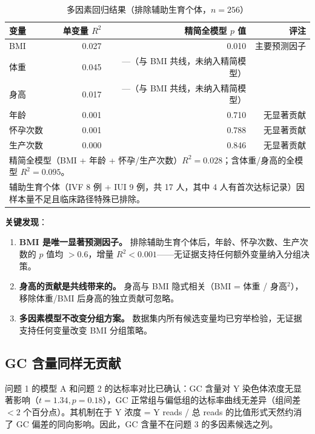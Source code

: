 \documentclass{mcm-paper}
\begin{document}
\begin{table}[H]
\centering
\caption{多因素回归结果（排除辅助生育个体，$n=256$）}
\label{tab:multi}
\begin{tabular}{lrrr}
\toprule
变量 & 单变量 $R^2$ & 精简全模型 $p$ 值 & 评注 \\
\midrule
BMI     & 0.027 & 0.010 & 主要预测因子 \\
体重     & 0.045 & —（与 BMI 共线，未纳入精简模型） & \\
身高     & 0.017 & —（与 BMI 共线，未纳入精简模型） & \\
年龄     & 0.001 & 0.710 & 无显著贡献 \\
怀孕次数   & 0.001 & 0.788 & 无显著贡献 \\
生产次数   & 0.000 & 0.846 & 无显著贡献 \\
\bottomrule
\multicolumn{4}{l}{\footnotesize 精简全模型（BMI + 年龄 + 怀孕/生产次数）$R^2=0.028$；含体重/身高的全模型 $R^2=0.095$。} \\
\multicolumn{4}{l}{\footnotesize 辅助生育个体（IVF 8 例 + IUI 9 例，共 17 人，其中 4 人有首次达标记录）因样本量不足且临床路径特殊已排除。} \\
\end{tabular}
\end{table}

\textbf{关键发现}：

\begin{enumerate}
    \item \textbf{BMI 是唯一显著预测因子。} 排除辅助生育个体后，年龄、怀孕次数、生产次数的 $p$ 值均 $>0.6$，增量 $R^2 < 0.001$——无证据支持任何额外变量纳入分组决策。
    \item \textbf{身高的贡献是共线带来的。} 身高与 BMI 隐式相关（BMI = 体重 / 身高$^2$），移除体重/BMI 后身高的独立贡献可忽略。
    \item \textbf{多因素模型不改变分组方案。} 数据集内所有候选变量均已穷举检验，无证据支持任何变量改变 BMI 分组策略。
\end{enumerate}

\subsection{GC 含量同样无贡献}

问题 1 的模型 A 和问题 2 的达标率对比已确认：GC 含量对 Y 染色体浓度无显著影响（$t=1.34, p=0.18$），GC 正常组与偏低组的达标率曲线无差异（组间差 $<2$ 个百分点）。其机制在于 Y 浓度 = Y reads / 总 reads 的比值形式天然约消了 GC 偏差的同向影响。因此，GC 含量不在问题 3 的多因素候选之列。
\end{document}
